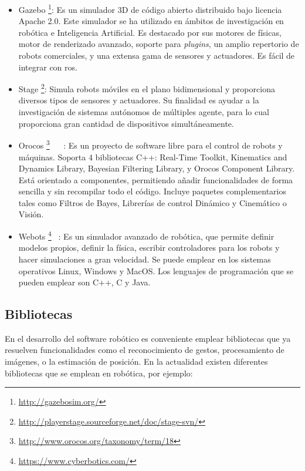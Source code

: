 \begin{itemize}
\item Gazebo \footnote{\url{http://gazebosim.org/}}: Es un simulador 3D de código abierto distribuido bajo licencia Apache 2.0. Este simulador se ha utilizado en ámbitos de investigación en robótica e Inteligencia Artificial. Es destacado por sus motores de físicas, motor de renderizado avanzado, soporte para \textit{plugins}, un amplio repertorio de robots comerciales, y una extensa gama de sensores y actuadores. Es fácil de integrar con \acrshort{ros}.
\item Stage \footnote{\url{http://playerstage.sourceforge.net/doc/stage-svn/}}: Simula robots móviles en el plano bidimensional y proporciona diversos tipos de sensores y actuadores. Su finalidad es ayudar a la investigación de sistemas autónomos de múltiples agente, para lo cual proporciona gran cantidad de dispositivos simultáneamente.
\item Orocos \footnote{\url{http://www.orocos.org/taxonomy/term/18}} ~\cite{orocos} ~\cite{orocos1}: Es un proyecto de software libre para el control de robots y máquinas. Soporta 4 bibliotecas C++: Real-Time Toolkit, Kinematics and Dynamics Library,  Bayesian Filtering Library, y  Orocos Component Library. Está orientado a componentes, permitiendo añadir funcionalidades de forma sencilla y sin recompilar todo el código.  Incluye paquetes complementarios tales como Filtros de Bayes, Librerías de control Dinámico y Cinemático o Visión. 
\item Webots \footnote{\url{https://www.cyberbotics.com/}} ~\cite{webots}: Es un simulador avanzado de robótica, que permite definir modelos propios, definir la física, escribir controladores para los robots y hacer simulaciones a gran velocidad. Se puede emplear en los sistemas operativos Linux, Windows y MacOS. Los lenguajes de programación que se pueden emplear son  C++, C y Java.
\end{itemize}

\subsection{Bibliotecas}
En el desarrollo del software robótico es conveniente emplear bibliotecas que ya resuelven funcionalidades como el reconocimiento de gestos, procesamiento de imágenes, o la estimación de posición. En la actualidad existen diferentes bibliotecas que se emplean en robótica, por ejemplo:

